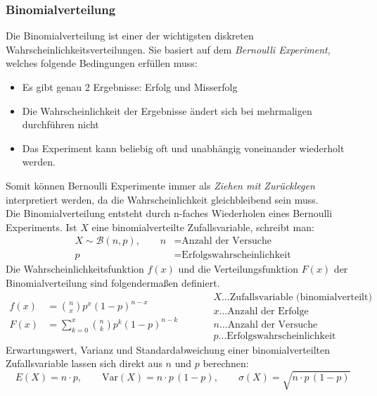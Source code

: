 \subsubsection{Binomialverteilung}
Die Binomialverteilung ist einer der wichtigsten diskreten Wahrscheinlichkeitsverteilungen. Sie basiert auf dem \emph{Bernoulli Experiment}, welches folgende Bedingungen erfüllen muss:
\begin{itemize}
    \item Es gibt genau 2 Ergebnisse: Erfolg und Misserfolg
    \item Die Wahrscheinlichkeit der Ergebnisse ändert sich bei mehrmaligen durchführen nicht
    \item Das Experiment kann beliebig oft und unabhängig voneinander wiederholt werden.
\end{itemize}
Somit können Bernoulli Experimente immer als \emph{Ziehen mit Zurücklegen} interpretiert werden, da die Wahrscheinlichkeit gleichbleibend sein muss. \\
Die Binomialverteilung entsteht durch n-faches Wiederholen eines Bernoulli Experiments. Ist $X$ eine binomialverteilte Zufallsvariable, schreibt man:
\begin{align}
    X \sim \mathcal{B}(n,p), \qquad n &= \text{Anzahl der Versuche} \\
                           p &= \text{Erfolgswahrscheinlichkeit} \nonumber
\end{align}
Die Wahrscheinlichkeitsfunktion $f(x)$ und die Verteilungsfunktion $F(x)$ der Binomialverteilung sind folgendermaßen definiert.
\begin{equation}
    \begin{aligned}
    f(x) &= \binom{n}{x} p^x (1-p)^{n-x} \\
    F(x) &= \sum_{k=0}^{x} \binom{n}{k} p^k (1-p)^{n-k}
    \end{aligned}
    \qquad
    \begin{aligned}
    &X\dots\text{Zufallsvariable (binomialverteilt)} \\
    &x\dots\text{Anzahl der Erfolge} \\
    &n\dots\text{Anzahl der Versuche} \\
    &p\dots\text{Erfolgswahrscheinlichkeit}
    \end{aligned}
\end{equation}
Erwartungswert, Varianz und Standardabweichung einer binomialverteilten Zufallsvariable lassen sich direkt aus $n$ und $p$ berechnen:
\begin{equation}
    E(X) = n\cdot p, \qquad
    \mathrm{Var}(X) = n\cdot p\,(1-p), \qquad
    \sigma(X) = \sqrt{n\cdot p\,(1-p)}
\end{equation}

